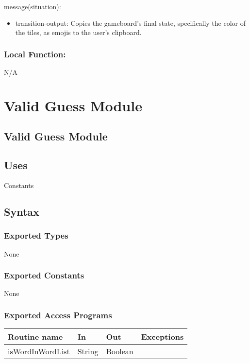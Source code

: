 \documentclass[12pt]{article}
\begin{document}
\noindent message(situation):
\begin{itemize}
  \item transition-output: Copies the gameboard's final state, specifically the color of the tiles, as emojis to the user's clipboard. 
\end{itemize}

\subsubsection*{Local Function:}

N/A


\newpage

\section {Valid Guess Module}

\subsection* {Valid Guess Module}

\subsection* {Uses}

Constants

\subsection* {Syntax}

\subsubsection* {Exported Types}

None

\subsubsection* {Exported Constants}

None

\subsubsection* {Exported Access Programs}

\begin{tabular}{| l | l | l | p{6cm} |}
\hline
\textbf{Routine name} & \textbf{In} & \textbf{Out} & \textbf{Exceptions}\\
\hline
isWordInWordList & String & Boolean &  \\
\hline
\end{tabular}
\end{document}

